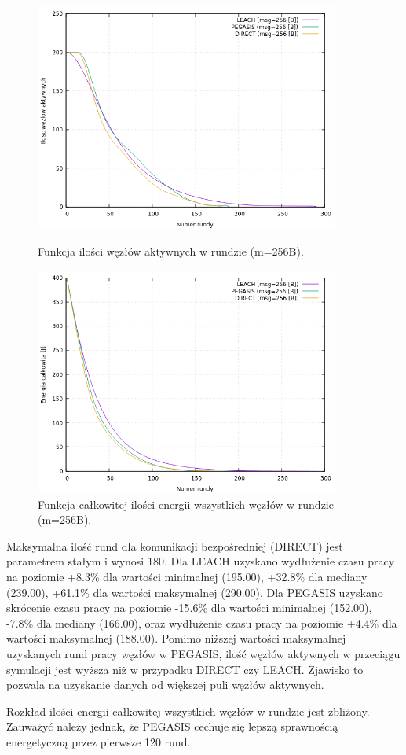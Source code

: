 \documentclass[a4paper,12pt,twoside,openany]{report}
\begin{document}
\begin{figure}[H]
 \centering
 \includegraphics[width=10cm]{images/gnuplot/test_1/nodes_in_round_m256.png}
 \caption{Funkcja ilości węzłów aktywnych w rundzie (m=256B).}
 \includegraphics[width=10cm]{images/gnuplot/test_1/energy_in_round_m256.png}
 \caption{Funkcja całkowitej ilości energii wszystkich węzłów w rundzie (m=256B).}
\end{figure}

\par
Maksymalna ilość rund dla komunikacji bezpośredniej (DIRECT) jest parametrem stałym i wynosi 180.
Dla LEACH uzyskano wydłużenie czasu pracy na poziomie +8.3\% dla wartości minimalnej (195.00), +32.8\% dla mediany (239.00), +61.1\% dla wartości maksymalnej (290.00).
Dla PEGASIS uzyskano skrócenie czasu pracy na poziomie -15.6\% dla wartości minimalnej (152.00), -7.8\% dla mediany (166.00), oraz wydłużenie czasu pracy na poziomie +4.4\% dla wartości maksymalnej (188.00).
Pomimo niższej wartości maksymalnej uzyskanych rund pracy węzłów w PEGASIS, ilość węzłów aktywnych w przeciągu symulacji jest wyższa niż w przypadku DIRECT czy LEACH.
Zjawisko to pozwala na uzyskanie danych od większej puli węzłów aktywnych.
\par
Rozkład ilości energii całkowitej wszystkich węzłów w rundzie jest zbliżony.
Zauważyć należy jednak, że PEGASIS cechuje się lepszą sprawnością energetyczną przez pierwsze 120 rund.
\end{document}
